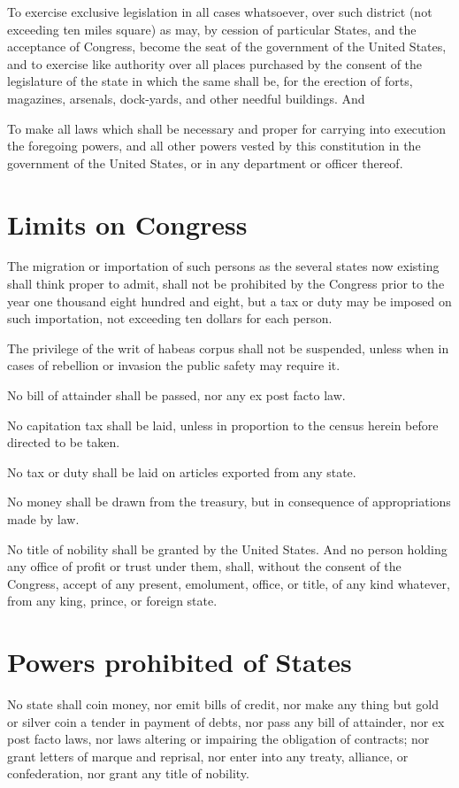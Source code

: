 \documentclass{constitution}
\begin{document}
To exercise exclusive legislation in all cases whatsoever, over such district (not exceeding ten miles square) as may,
by cession of particular States, and the acceptance of Congress,
become the seat of the government of the United States,
and to exercise like authority over all places purchased by the consent of the legislature of the state in which the same shall be, for the erection of forts, magazines, arsenals, dock-yards, and other needful buildings. And

To make all laws which shall be necessary and proper for carrying into execution the foregoing powers,
and all other powers vested by this constitution in the government of the United States,
or in any department or officer thereof.

\section{Limits on Congress}
The migration or importation of such persons as the several states now existing shall think proper to admit, shall not be prohibited by the Congress prior to the year one thousand eight hundred and eight,
but a tax or duty may be imposed on such importation, not exceeding ten dollars for each person.

The privilege of the writ of habeas corpus shall not be suspended,
unless when in cases of rebellion or invasion the public safety may require it.

No bill of attainder shall be passed, nor any ex post facto law.

No capitation tax shall be laid,
unless in proportion to the census herein before directed to be taken.

No tax or duty shall be laid on articles exported from any state.

No money shall be drawn from the treasury, but in consequence of appropriations made by law.

No title of nobility shall be granted by the United States.
And no person holding any office of profit or trust under them, shall, without the consent of the Congress, accept of any present, emolument, office, or title, of any kind whatever, from any king, prince, or foreign state.

\section{Powers prohibited of States}
No state shall coin money,
nor emit bills of credit,
nor make any thing but gold or silver coin a tender in payment of debts,
nor pass any bill of attainder,
nor ex post facto laws,
nor laws altering or impairing the obligation of contracts;
nor grant letters of marque and reprisal,
nor enter into any treaty, alliance, or confederation,
nor grant any title of nobility.
\end{document}
